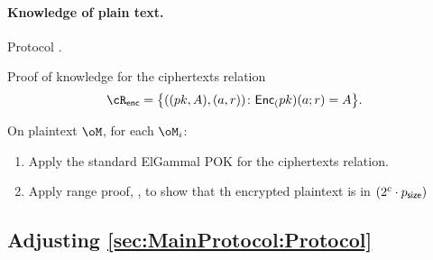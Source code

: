 \paragraph{Knowledge of plain text.}  
Protocol \piZKPOK{\rKeyGen}. 

\newcommand{\rEnc}{{\cR_{\sf enc}}}

\newcommand{\rEncDef}
{
	\set{((pk,A),(a,r))\colon \Enc_(pk)(a;r)= A}
}


Proof of knowledge for   the ciphertexts  relation  
$$\rEnc =\rEncDef.$$


On  plaintext $\oM$, for each $\oM_i$:
\begin{enumerate}
	\item Apply the  standard ElGammal POK for the ciphertexts relation. 
	
	\item Apply range proof, \ie \piZKPOK{\rRP}, to show that th encrypted plaintext is in $(2^c \cdot p_{\mathsf{size}})$
\end{enumerate}

 




\subsection{Adjusting  \cref{sec:MainProtocol:Protocol}}\label{sec:ChanksEG:Adjusting}
